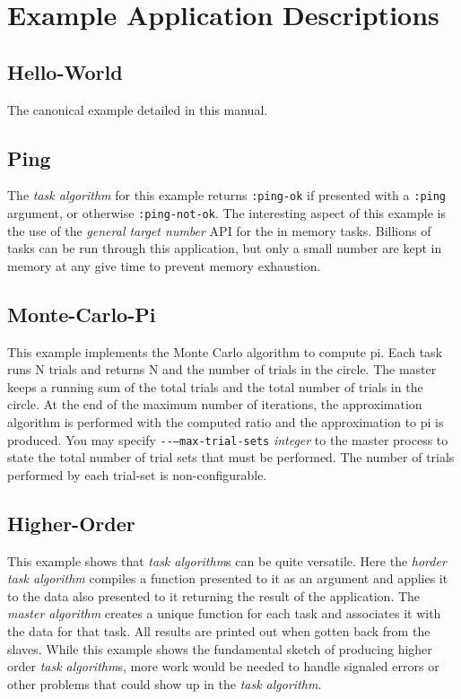 \documentclass[titlepage,12pt]{book}
\newcommand{\ma}{\textit{master algorithm}\xspace}
\newcommand{\ta}{\textit{task algorithm}\xspace}
\newcommand{\tas}{\textit{task algorithm}s\xspace}
\newcommand{\dash}{\texttt{-}}
\newcommand{\OptionV}[2]{\dash\dash\texttt{#1} \textit{#2}}
\newcommand{\keyword}[1]{\texttt{:#1}\xspace}
\begin{document}

\appendix

\chapter{Example Application Descriptions}

\section{Hello-World}
The canonical example detailed in this manual.

\section{Ping}
The \ta for this example returns \keyword{ping-ok} if presented with
a \keyword{ping} argument, or otherwise \keyword{ping-not-ok}. The
interesting aspect of this example is the use of the \emph{general
target number} API for the in memory tasks. Billions of tasks can
be run through this application, but only a small number are kept in
memory at any give time to prevent memory exhaustion.

\section{Monte-Carlo-Pi}
This example implements the Monte Carlo algorithm to compute pi. Each
task runs N trials and returns N and the number of trials in the
circle.  The master keeps a running sum of the total trials and
the total number of trials in the circle. At the end of the maximum
number of iterations, the approximation algorithm is performed with
the computed ratio and the approximation to pi is produced.  You may
specify \OptionV{--max-trial-sets}{integer} to the master process
to state the total number of trial sets that must be performed. The
number of trials performed by each trial-set is non-configurable.

\section{Higher-Order}
This example shows that \tas can be quite versatile. Here the
\textit{horder} \ta compiles a function presented to it as an argument
and applies it to the data also presented to it returning the result
of the application. The \ma creates a unique function for each task
and associates it with the data for that task. All results are printed
out when gotten back from the slaves. While this example shows the
fundamental sketch of producing higher order \tas, more work would
be needed to handle signaled errors or other problems that could show
up in the \ta.
\end{document}
